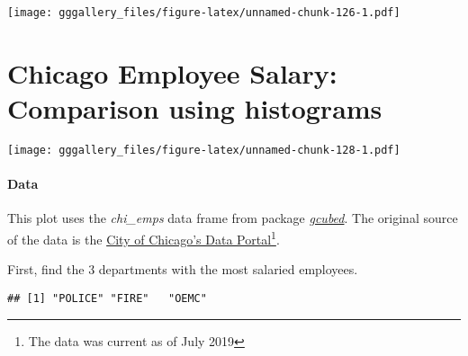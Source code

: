 \documentclass[]{book}
\newenvironment{Shaded}{\begin{snugshade}}{\end{snugshade}}
\newcommand{\DataTypeTok}[1]{\textcolor[rgb]{0.13,0.29,0.53}{#1}}
\newcommand{\DecValTok}[1]{\textcolor[rgb]{0.00,0.00,0.81}{#1}}
\newcommand{\KeywordTok}[1]{\textcolor[rgb]{0.13,0.29,0.53}{\textbf{#1}}}
\newcommand{\NormalTok}[1]{#1}
\newcommand{\OperatorTok}[1]{\textcolor[rgb]{0.81,0.36,0.00}{\textbf{#1}}}
\newcommand{\OtherTok}[1]{\textcolor[rgb]{0.56,0.35,0.01}{#1}}
\newcommand{\StringTok}[1]{\textcolor[rgb]{0.31,0.60,0.02}{#1}}
\let\rmarkdownfootnote\footnote%
\def\footnote{\protect\rmarkdownfootnote}
\begin{document}
\texttt{[image: gggallery\_files/figure-latex/unnamed-chunk-126-1.pdf]}

\hypertarget{comphists}{%
\chapter*{Chicago Employee Salary: Comparison using histograms}\label{comphists}}

\texttt{[image: gggallery\_files/figure-latex/unnamed-chunk-128-1.pdf]}

\hypertarget{comphistsdata}{%
\subsubsection*{Data}\label{comphistsdata}}

This plot uses the \emph{chi\_emps} data frame from package \protect\hyperlink{gcubed}{\emph{gcubed}}.
The original source of the data is the \href{https://data.cityofchicago.org/Administration-Finance/Current-Employee-Names-Salaries-and-Position-Title/xzkq-xp2w}{City of Chicago's Data Portal}\footnote{The data was current as of July 2019}.

First, find the 3 departments with the most salaried employees.

\begin{Shaded}
\end{Shaded}

\begin{verbatim}
## [1] "POLICE" "FIRE"   "OEMC"
\end{verbatim}

\begin{Shaded}
\end{Shaded}
\end{document}

